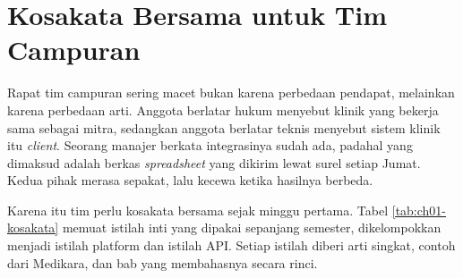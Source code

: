 \section{Kosakata Bersama untuk Tim Campuran}

Rapat tim campuran sering macet bukan karena perbedaan pendapat, melainkan karena
perbedaan arti. Anggota berlatar hukum menyebut klinik yang bekerja sama sebagai
mitra, sedangkan anggota berlatar teknis menyebut sistem klinik itu
\textit{client}. Seorang manajer berkata integrasinya sudah ada, padahal yang
dimaksud adalah berkas \textit{spreadsheet} yang dikirim lewat surel setiap
Jumat. Kedua pihak merasa sepakat, lalu kecewa ketika hasilnya berbeda.

Karena itu tim perlu kosakata bersama sejak minggu pertama. Tabel
\ref{tab:ch01-kosakata} memuat istilah inti yang dipakai sepanjang semester,
dikelompokkan menjadi istilah platform dan istilah API. Setiap istilah diberi arti
singkat, contoh dari Medikara, dan bab yang membahasnya secara rinci.

